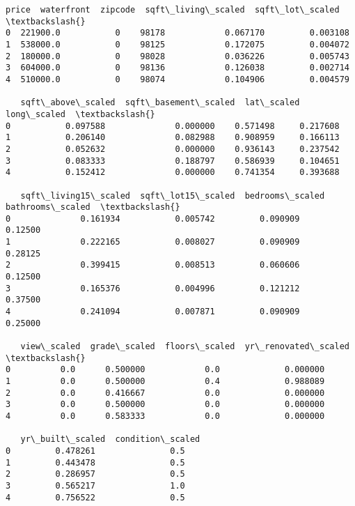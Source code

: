 \documentclass[11pt]{report}
\makeatletter
\newcommand{\boxspacing}{\kern\kvtcb@left@rule\kern\kvtcb@boxsep}
\newcommand{\prompt}[4]{
        {\ttfamily\llap{{\color{#2}[#3]:\hspace{3pt}#4}}\vspace{-\baselineskip}}
    }
\makeatother
\begin{document}
            \begin{tcolorbox}[breakable, size=fbox, boxrule=.5pt, pad at break*=1mm, opacityfill=0]
\prompt{Out}{outcolor}{19}{\boxspacing}
\begin{Verbatim}[commandchars=\\\{\}]
      price  waterfront  zipcode  sqft\_living\_scaled  sqft\_lot\_scaled  \textbackslash{}
0  221900.0           0    98178            0.067170         0.003108
1  538000.0           0    98125            0.172075         0.004072
2  180000.0           0    98028            0.036226         0.005743
3  604000.0           0    98136            0.126038         0.002714
4  510000.0           0    98074            0.104906         0.004579

   sqft\_above\_scaled  sqft\_basement\_scaled  lat\_scaled  long\_scaled  \textbackslash{}
0           0.097588              0.000000    0.571498     0.217608
1           0.206140              0.082988    0.908959     0.166113
2           0.052632              0.000000    0.936143     0.237542
3           0.083333              0.188797    0.586939     0.104651
4           0.152412              0.000000    0.741354     0.393688

   sqft\_living15\_scaled  sqft\_lot15\_scaled  bedrooms\_scaled  bathrooms\_scaled  \textbackslash{}
0              0.161934           0.005742         0.090909           0.12500
1              0.222165           0.008027         0.090909           0.28125
2              0.399415           0.008513         0.060606           0.12500
3              0.165376           0.004996         0.121212           0.37500
4              0.241094           0.007871         0.090909           0.25000

   view\_scaled  grade\_scaled  floors\_scaled  yr\_renovated\_scaled  \textbackslash{}
0          0.0      0.500000            0.0             0.000000
1          0.0      0.500000            0.4             0.988089
2          0.0      0.416667            0.0             0.000000
3          0.0      0.500000            0.0             0.000000
4          0.0      0.583333            0.0             0.000000

   yr\_built\_scaled  condition\_scaled
0         0.478261               0.5
1         0.443478               0.5
2         0.286957               0.5
3         0.565217               1.0
4         0.756522               0.5
\end{Verbatim}
\end{tcolorbox}
        
\end{document}
